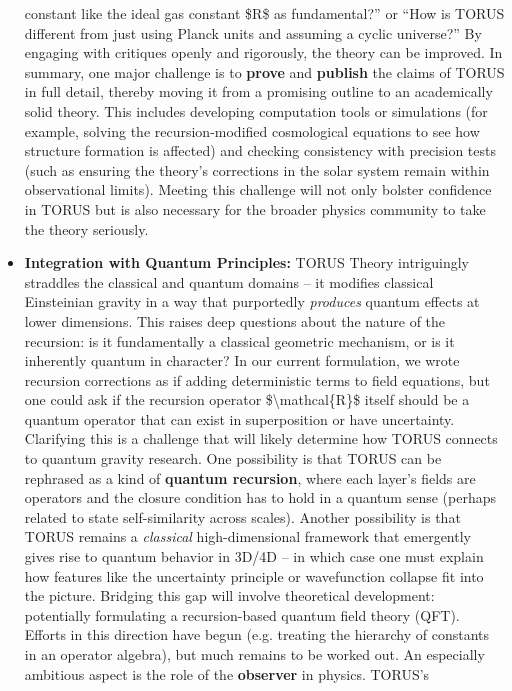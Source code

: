 \documentclass[]{article}
\begin{document}
\begin{itemize}
  constant like the ideal gas constant \$R\$ as fundamental?'' or ``How
  is TORUS different from just using Planck units and assuming a cyclic
  universe?'' By engaging with critiques openly and rigorously, the
  theory can be improved. In summary, one major challenge is to
  \textbf{prove} and \textbf{publish} the claims of TORUS in full
  detail, thereby moving it from a promising outline to an academically
  solid theory. This includes developing computation tools or
  simulations (for example, solving the recursion-modified cosmological
  equations to see how structure formation is affected​) and checking
  consistency with precision tests (such as ensuring the theory's
  corrections in the solar system remain within observational limits​).
  Meeting this challenge will not only bolster confidence in TORUS but
  is also necessary for the broader physics community to take the theory
  seriously.
\item
  \textbf{Integration with Quantum Principles:} TORUS Theory
  intriguingly straddles the classical and quantum domains -- it
  modifies classical Einsteinian gravity in a way that purportedly
  \emph{produces} quantum effects at lower dimensions. This raises deep
  questions about the nature of the recursion: is it fundamentally a
  classical geometric mechanism, or is it inherently quantum in
  character? In our current formulation, we wrote recursion corrections
  as if adding deterministic terms to field equations, but one could ask
  if the recursion operator \$\textbackslash{}mathcal\{R\}\$ itself
  should be a quantum operator that can exist in superposition or have
  uncertainty​. Clarifying this is a challenge that will likely
  determine how TORUS connects to quantum gravity research. One
  possibility is that TORUS can be rephrased as a kind of
  \textbf{quantum recursion}, where each layer's fields are operators
  and the closure condition has to hold in a quantum sense (perhaps
  related to state self-similarity across scales). Another possibility
  is that TORUS remains a \emph{classical} high-dimensional framework
  that emergently gives rise to quantum behavior in 3D/4D -- in which
  case one must explain how features like the uncertainty principle or
  wavefunction collapse fit into the picture. Bridging this gap will
  involve theoretical development: potentially formulating a
  recursion-based quantum field theory (QFT). Efforts in this direction
  have begun (e.g. treating the hierarchy of constants in an operator
  algebra), but much remains to be worked out. An especially ambitious
  aspect is the role of the \textbf{observer} in physics. TORUS's

\end{itemize}
\end{document}
